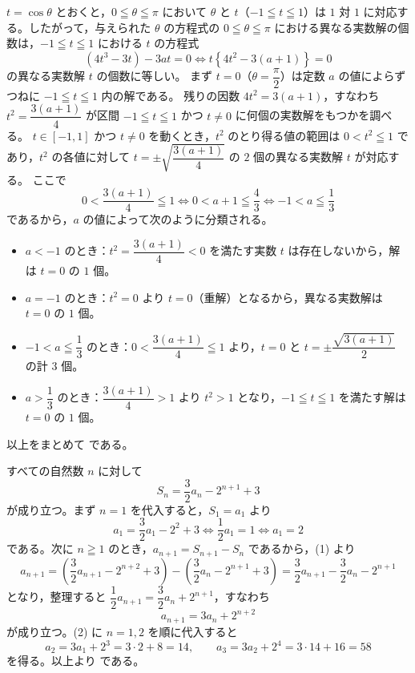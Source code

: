 $t=\cos\theta$ とおくと，$0\leqq\theta\leqq\pi$ において $\theta$ と $t$（$-1\leqq t\leqq 1$）は $1$ 対 $1$ に対応する。したがって，与えられた $\theta$ の方程式の $0\leqq\theta\leqq\pi$ における異なる実数解の個数は，$-1\leqq t\leqq 1$ における $t$ の方程式
\[
  (4t^{3}-3t)-3at=0 \iff t\left\{4t^{2}-3(a+1)\right\}=0
\]
の異なる実数解 $t$ の個数に等しい。
まず $t=0$（$\theta=\dfrac{\pi}{2}$）は定数 $a$ の値によらずつねに $-1\leqq t\leqq 1$ 内の解である。
残りの因数 $4t^{2}=3(a+1)$，すなわち $t^{2}=\dfrac{3(a+1)}{4}$ が区間 $-1\leqq t\leqq 1$ かつ $t\ne 0$ に何個の実数解をもつかを調べる。
$t\in[-1, 1]$ かつ $t\ne 0$ を動くとき，$t^{2}$ のとり得る値の範囲は $0<t^{2}\leqq 1$ であり，$t^{2}$ の各値に対して $t=\pm\sqrt{\dfrac{3(a+1)}{4}}$ の $2$ 個の異なる実数解 $t$ が対応する。
ここで
\[
  0<\frac{3(a+1)}{4}\leqq 1 \iff 0<a+1\leqq\frac{4}{3} \iff -1<a\leqq\frac{1}{3}
\]
であるから，$a$ の値によって次のように分類される。
\begin{itemize}[leftmargin=1.6em,itemsep=2pt]
  \item $a<-1$ のとき：$t^{2}=\dfrac{3(a+1)}{4}<0$ を満たす実数 $t$ は存在しないから，解は $t=0$ の $1$ 個。
  \item $a=-1$ のとき：$t^{2}=0$ より $t=0$（重解）となるから，異なる実数解は $t=0$ の $1$ 個。
  \item $-1<a\leqq\dfrac{1}{3}$ のとき：$0<\dfrac{3(a+1)}{4}\leqq 1$ より，$t=0$ と $t=\pm\dfrac{\sqrt{3(a+1)}}{2}$ の計 $3$ 個。
  \item $a>\dfrac{1}{3}$ のとき：$\dfrac{3(a+1)}{4}>1$ より $t^{2}>1$ となり，$-1\leqq t\leqq 1$ を満たす解は $t=0$ の $1$ 個。
\end{itemize}
以上をまとめて
である。


すべての自然数 $n$ に対して
\[
  S_{n}=\frac{3}{2}a_{n}-2^{n+1}+3 \tag{1}
\]
が成り立つ。まず $n=1$ を代入すると，$S_{1}=a_{1}$ より
\[
  a_{1}=\frac{3}{2}a_{1}-2^{2}+3 \iff \frac{1}{2}a_{1}=1 \iff a_{1}=2
\]
である。次に $n\geqq 1$ のとき，$a_{n+1}=S_{n+1}-S_{n}$ であるから，(1) より
\[
  a_{n+1}=\left(\frac{3}{2}a_{n+1}-2^{n+2}+3\right)-\left(\frac{3}{2}a_{n}-2^{n+1}+3\right)
  =\frac{3}{2}a_{n+1}-\frac{3}{2}a_{n}-2^{n+1}
\]
となり，整理すると $\dfrac{1}{2}a_{n+1}=\dfrac{3}{2}a_{n}+2^{n+1}$，すなわち
\[
  a_{n+1}=3a_{n}+2^{n+2} \tag{2}
\]
が成り立つ。(2) に $n=1, 2$ を順に代入すると
\[
  a_{2}=3a_{1}+2^{3}=3\cdot 2+8=14,\qquad
  a_{3}=3a_{2}+2^{4}=3\cdot 14+16=58
\]
を得る。以上より
である。

